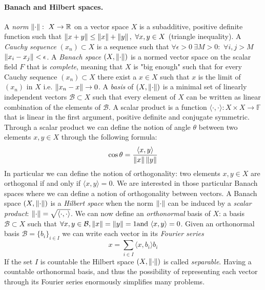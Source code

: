 \paragraph{Banach and Hilbert spaces.}
A \textit{norm} $\left\lVert\cdot\right\rVert:\ X\to\mathbb R$ on a vector space $X$ is a subadditive, positive definite function such that $\left\lVert x+y\right\rVert\leq\left\lVert x\right\rVert +\left\lVert y\right\rVert,\ \forall x,y\in X$ (triangle inequality). A \textit{Cauchy sequence} $(x_n)\subset X$ is a sequence such that $\forall \epsilon>0\  \exists M>0: $ $\forall i,j>M$ $ \left\lVert x_i-x_j\right\rVert<\epsilon$. A \textit{Banach space} $(X, \left\lVert\cdot\right\rVert)$ is a normed vector space on the scalar field $F$ that is \textit{complete}, meaning that $X$ is "big enough" such that for every Cauchy sequence $(x_n)\subset X$ there exist a $x\in X$ such that $x$ is the limit of $(x_n)$ in $X$ i.e. $\left\lVert x_n-x\right\rVert\rightarrow 0$. A \textit{basis} of $(X, \left\lVert\cdot\right\rVert)$ is a minimal set of linearly independent vectors $\mathcal B \subset X$ such that every element of $X$ can be written as linear combination of the elements of $\mathcal B$. A scalar product is a function $\langle\cdot,\cdot\rangle: X\times X \rightarrow \mathbb F$ that is linear in the first argument, positive definite and conjugate symmetric. Through a scalar product we can define the notion of angle $\theta$ between two elements $x, y \in X$ through the following formula: 
$$
\cos \theta = \frac{\langle x, y\rangle}{\left\lVert x\right\rVert \left\lVert y\right\rVert}
$$ 
In particular we can define the notion of orthogonality: two elements  $x, y \in X$ are orthogonal if and only if $\langle x, y\rangle=0$. We are interested in those particular Banach spaces where we can define a notion of orthogonality between vectors. A Banach space $(X, \left\lVert\cdot\right\rVert )$ is a \textit{Hilbert space} when the norm $ \left\lVert\cdot\right\rVert $ can be induced by a \textit{scalar product}: $\left\lVert\cdot\right\rVert = \sqrt{\langle\cdot,\cdot\rangle}$. We can now define an \textit{orthonormal} basis of $X$: a basis $\mathcal B \subset X$ such that $\forall x, y \in \mathcal B, \left\lVert x\right\rVert = \left\lVert y\right\rVert = 1 \text{and } \langle x, y\rangle = 0$. Given an orthonormal basis $\mathcal B = \{b_i\}_{i\in I}$ we can write each vector in its \textit{Fourier series} 
\begin{equation}\label{eq:abstract fourier}
x = \sum_{i\in I} \langle x, b_i\rangle b_i
\end{equation}
If the set $I$ is countable the Hilbert space $(X, \left\lVert\cdot\right\rVert)$ is called \textit{separable}. Having a countable orthonormal basis, and thus the possibility of representing each vector through its Fourier series enormously simplifies many problems.
